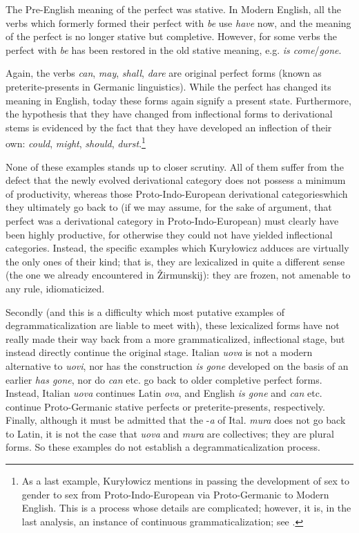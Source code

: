 The Pre-English meaning of the perfect was stative. In Modern English, all the verbs which formerly formed their perfect with \textit{be} use \textit{have} now, and the meaning of the perfect is no longer stative but completive. However, for some verbs the perfect with \textit{be} has been restored in the old stative meaning, e.g. \textit{is come}/\textit{gone}.

Again, the verbs \textit{can}, \textit{may}, \textit{shall}, \textit{dare} are original perfect forms (known as preterite-presents in Germanic linguistics). While the perfect has changed its meaning in English, today these forms again signify a present state. Furthermore, the hypothesis that they have changed from inflectional forms to derivational stems is evidenced by the fact that they have developed an inflection of their own: \textit{could}, \textit{might}, \textit{should}, \textit{durst}.\footnote{As a last example, Kuryłowicz mentions in passing the development of sex to gender to sex from Proto-Indo-European via Proto-Germanic to Modern English. This is a process whose details are complicated; however, it is, in the last analysis, an instance of continuous grammaticalization; see \citet[§7.2]{Lehmann1982b}.}

None of these examples stands up to closer scrutiny. All of them suffer from the defect that the newly evolved derivational category does not possess a minimum of productivity, whereas those Proto-Indo-European derivational categories\linebreak which they ultimately go back to (if we may assume, for the sake of argument, that perfect was a derivational category in Proto-Indo-European) must clearly have been highly productive, for otherwise they could not have yielded inflectional categories. Instead, the specific examples which Kuryłowicz adduces are virtually the only ones of their kind; that is, they are lexicalized in quite a different sense (the one we already encountered in Žirmunskij): they are frozen, not amenable to any rule, idiomaticized.

Secondly (and this is a difficulty which most putative examples of degrammaticalization are liable to meet with), these lexicalized forms have not really made their way back from a more grammaticalized, inflectional stage, but instead directly continue the original stage. Italian \textit{uova} is not a modern alternative to \textit{uovi}, nor has the construction \textit{is gone} developed on the basis of an earlier \textit{has gone}, nor do \textit{can} etc. go back to older completive perfect forms. Instead, Italian \textit{uova} continues Latin \textit{ova}, and English \textit{is gone} and \textit{can} etc. continue Proto-Germanic stative perfects or preterite-presents, respectively. Finally, although it must be admitted that the -\textit{a} of Ital. \textit{mura} does not go back to Latin, it is not the case that \textit{uova} and \textit{mura} are collectives; they are plural forms. So these examples do not establish a degrammaticalization process.

